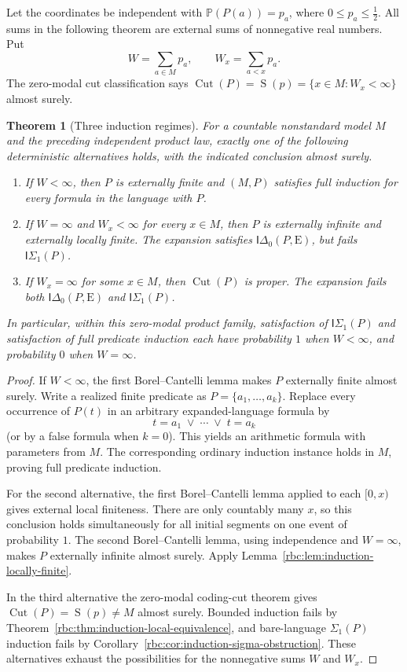 \documentclass[11pt]{article}
\numberwithin{equation}{section}
\newtheorem{theorem}{Theorem}[section]
\theoremstyle{definition}
\theoremstyle{remark}
\newcommand{\E}{\mathrm E}
\newcommand{\Cut}{\operatorname{Cut}}
\newcommand{\SumCut}{\operatorname{S}}
\newcommand{\Prob}{\mathbb P}
\begin{document}
Let the coordinates be independent with
$\Prob(P(a))=p_a$, where $0\le p_a\le\tfrac12$.
All sums in the following theorem are external sums of nonnegative
real numbers.  Put
\[
 W=\sum_{a\in M}p_a,
 \qquad
 W_x=\sum_{a<x}p_a.
\]
The zero-modal cut classification says
$\Cut(P)=\SumCut(p)=\{x\in M:W_x<\infty\}$ almost surely.

\begin{theorem}[Three induction regimes]
\label{rbc:thm:induction-three-regimes}
For a countable nonstandard model $M$ and the preceding independent
product law, exactly one of the following deterministic alternatives
holds, with the indicated conclusion almost surely.
\begin{enumerate}
 \item If $W<\infty$, then $P$ is externally finite and
 $(M,P)$ satisfies full induction for every formula in the language
 with $P$.
 \item If $W=\infty$ and $W_x<\infty$ for every $x\in M$, then
 $P$ is externally infinite and externally locally finite.
 The expansion satisfies $\mathsf{I}\Delta_0(P,\E)$, but fails
 $\mathsf{I}\Sigma_1(P)$.
 \item If $W_x=\infty$ for some $x\in M$, then $\Cut(P)$ is
 proper.  The expansion fails both
 $\mathsf{I}\Delta_0(P,\E)$ and
 $\mathsf{I}\Sigma_1(P)$.
\end{enumerate}
In particular, within this zero-modal product family, satisfaction
of $\mathsf{I}\Sigma_1(P)$ and satisfaction of full predicate
induction each have probability $1$ when $W<\infty$, and probability
$0$ when $W=\infty$.
\end{theorem}

\begin{proof}
If $W<\infty$, the first Borel--Cantelli lemma makes $P$ externally
finite almost surely.  Write a realized finite predicate as
$P=\{a_1,\ldots,a_k\}$.  Replace every occurrence of $P(t)$ in an
arbitrary expanded-language formula by
\[
       t=a_1\;\vee\;\cdots\;\vee\;t=a_k
\]
(or by a false formula when $k=0$).  This yields an arithmetic
formula with parameters from $M$.  The corresponding ordinary
induction instance holds in $M$, proving full predicate induction.

For the second alternative, the first Borel--Cantelli lemma applied
to each $[0,x)$ gives external local finiteness.  There are only
countably many $x$, so this conclusion holds simultaneously for
all initial segments on one event of probability $1$.
The second Borel--Cantelli lemma, using independence and $W=\infty$,
makes $P$ externally infinite almost surely.  Apply
Lemma~\ref{rbc:lem:induction-locally-finite}.

In the third alternative the zero-modal coding-cut theorem gives
$\Cut(P)=\SumCut(p)\ne M$ almost surely.  Bounded induction fails
by Theorem~\ref{rbc:thm:induction-local-equivalence}, and bare-language
$\Sigma_1(P)$ induction fails by
Corollary~\ref{rbc:cor:induction-sigma-obstruction}.
These alternatives exhaust the possibilities for the nonnegative
sums $W$ and $W_x$.
\end{proof}
\end{document}
